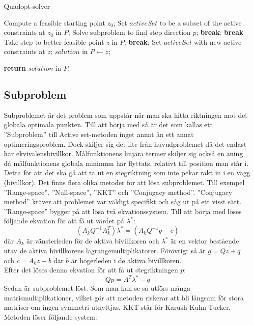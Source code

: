 \begin{algorithm}[H]
\caption{Quadopt-solver}
\label{alg:quadoptsolver}
\begin{algorithmic}
	\State Compute a feasible starting point $z_0$;
\EndIf	
\State Set $activeSet$ to be a subset of the active constraints at $z_0$ in $P$;
	\State Solve subproblem to find step direction $p$;
			\State \textbf{break};
		\EndIf		
			\State \textbf{break}
		\EndIf
	\Else
		\State Take step to better feasible point $z$ in $P$;
			\State \textbf{break};
		\EndIf
		\State Set $activeSet$ with new active constraints at $z$;	
	\EndIf
\EndWhile
\State  $solution$ in $P\gets z$;

\State \textbf{return} $solution$ in $P$;
	
\EndProcedure
\end{algorithmic}
\end{algorithm}

\subsection{Subproblem}
Subproblemet är det problem som uppstår när man ska hitta riktningen mot det globala optimala punkten. Till att börja med så är det som kallas ett ''Subproblem'' till Active set-metoden inget annat än ett annat optimeringsproblem. Dock skiljer sig det lite från huvudproblemet då det endast har ekvivalensbivillkor. Målfunktionens linjära termer skiljer sig också en aning då målfunktionens globala minimum har flyttats, relativt till position man står i. Detta för att det ska gå att ta ut en stegriktning som inte pekar rakt in i en vägg (bivillkor). 
\newline
\newline
Det finns flera olika metoder för att lösa subproblemet.
Till exempel ''Range-space'', ''Null-space'', ''KKT'' och ''Conjugacy method''. ''Conjugacy method'' kräver att problemet var väldigt specifikt och såg ut på ett visst sätt. ''Range-space'' bygger på att lösa två ekvationssystem. Till att börja med löses följande ekvation för att få ut värdet på $\lambda^*$:
$$({A_k}Q^{-1}A_k^T)\lambda^* = ({A_k}Q^{-1}g-c)$$
där $A_k$ är vänsterleden för de aktiva bivillkoren och $\lambda^*$ är en vektor bestående utav de aktiva bivillkorens lagrangemultiplikatorer. Förövrigt så är
$g = Qz+q$ och $c = A_kz - b$ där $b$ är högerleden i de aktiva bivillkoren. \\ Efter det löses denna ekvation för att få ut stegriktningen $p$:
$$Qp = A^T\lambda^* - q$$
Sedan är subproblemet löst. Som man kan se så utförs många matrismultiplikationer, vilket gör att metoden riskerar att bli långsam för stora matriser om ingen symmetri utnyttjas. 
\newline
\newline
KKT står för Karush-Kuhn-Tucker. Metoden löser följande system:

